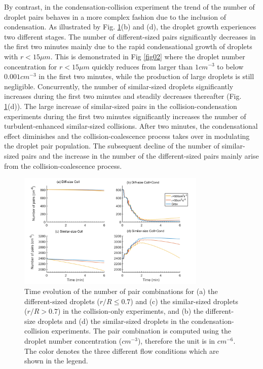 By contrast, in the condensation-collision experiment the trend of the number of droplet pairs behaves in a more complex fashion due to the inclusion of condensation. As illustrated by Fig. \ref{fig05}(b) and (d), the droplet growth experiences two different stages. The number of different-sized pairs significantly decreases in the first two minutes mainly due to the rapid condensational growth of droplets with $r < 15 \mu m$. This is demonstrated in Fig \ref{fig02} where the droplet number concentration for $r < 15 \mu m$ quickly reduces from larger than $1cm^{-3}$ to below $0.001cm^{-3}$ in the first two minutes, while the production of large droplets is still negligible. Concurrently, the number of similar-sized droplets significantly increases during the first two minutes and steadily decreases thereafter (Fig. \ref{fig05}(d)). The large increase of similar-sized pairs in the collision-condensation experiments during the first two minutes significantly increases the number of turbulent-enhanced similar-sized collisions. After two minutes, the condensational effect diminishes and the collision-coalescence process takes over in modulating the droplet pair population. The subsequent decline of the number of similar-sized pairs and the increase in the number of the different-sized pairs mainly arise from the collision-coalescence process.


\begin{figure}[h]
\centering
\includegraphics[width=0.8\textwidth]{Figures/Chap4/Pair_numbers.png}
\caption{Time evolution of the number of pair combinations for (a) the different-sized droplets ($r/R \leq 0.7$) and (c) the similar-sized droplets ($r/R>0.7$) in the collision-only experiments, and (b) the different-size droplets and (d) the similar-sized droplets in the condensation-collision experiments. The pair combination is computed using the droplet number concentration ($cm^{-3}$), therefore the unit is in $cm^{-6}$. The color denotes the three different flow conditions which are shown in the legend.}\label{fig05}
\end{figure}

